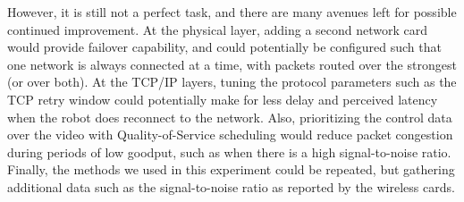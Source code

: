 \documentclass{IEEEtran}
\begin{document}
However, it is still not a perfect task, and there are many avenues left for
possible continued improvement. At the physical layer, adding a second
network card would provide failover capability, and could potentially be
configured such that one network is always connected at a time, with packets
routed over the strongest (or over both). At the TCP/IP layers, tuning the
protocol parameters such as the TCP retry window could potentially make for
less delay and perceived latency when the robot does reconnect to the network.
Also, prioritizing the control data over the video with Quality-of-Service
scheduling would reduce packet congestion during periods of low goodput, such
as when there is a high signal-to-noise ratio. Finally, the methods we used
in this experiment could be repeated, but gathering additional data such
as the signal-to-noise ratio as reported by the wireless cards.



\end{document}
